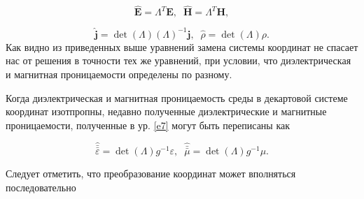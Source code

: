 \documentclass[12pt,a4paper]{article}
\begin{document}
\begin{equation}\label{e8}
	\mathbf{\hat{E}} = \Lambda^T\mathbf{E}, \;\; 
	\mathbf{\hat{H}} = \Lambda^T\mathbf{H},
\end{equation}

\begin{equation}\label{e9}
\mathbf{\hat{j}} = \det(\Lambda)(\Lambda)^{-1}\mathbf{j}, \;\;
\hat{\rho} = \det(\Lambda)\rho.	
\end{equation}
Как видно из приведенных выше уравнений замена системы координат не спасает нас от решения в точности 
тех же уравнений, при условии, что диэлектрическая и магнитная проницаемости определены по разному.

Когда диэлектрическая и магнитная проницаемость среды в декартовой системе координат изотпропны,
недавно полученные диэлектрические и магнитные проницаемости, полученные в ур. \ref{e7} могут
быть переписаны как

\begin{equation}
	\hat{\bar{\bar{\varepsilon}}} = \det(\Lambda)g^{-1} \varepsilon,\;\;
	\hat{\bar{\bar{\mu}}} = \det(\Lambda)g^{-1} \mu.	
\end{equation}

Следует отметить, что преобразование координат может вполняться последовательно
\end{document}
